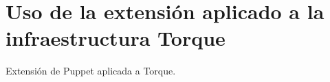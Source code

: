 \chapter{Uso de la extensión aplicado a la infraestructura Torque}
\label{cap:torque}

Extensión de Puppet aplicada a Torque.
